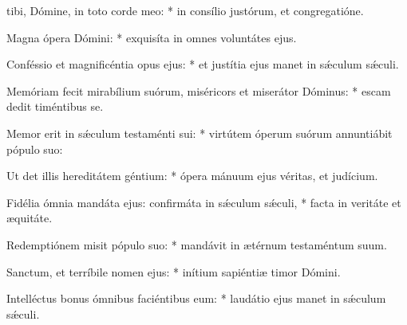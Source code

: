 \begin{psalmus}

     tibi, Dómine, in toto corde meo: * in consílio justórum, et congregatióne.

    Magna ópera Dómini: * exquisíta in omnes voluntátes ejus.

    Conféssio et magnificéntia opus ejus: * et justítia ejus manet in sǽculum sǽculi.

    Memóriam fecit mirabílium suórum, miséricors et miserátor Dóminus: * escam dedit timéntibus se.

    Memor erit in sǽculum testaménti sui: * virtútem óperum suórum annuntiábit pópulo suo:

    Ut det illis hereditátem géntium: * ópera mánuum ejus véritas, et judícium.

    Fidélia ómnia mandáta ejus: confirmáta in sǽculum sǽculi, * facta in veritáte et æquitáte.

    Redemptiónem misit pópulo suo: * mandávit in ætérnum testaméntum suum.

    Sanctum, et terríbile nomen ejus: * inítium sapiéntiæ timor Dómini.

    Intelléctus bonus ómnibus faciéntibus eum: * laudátio ejus manet in sǽculum sǽculi.

\end{psalmus}
